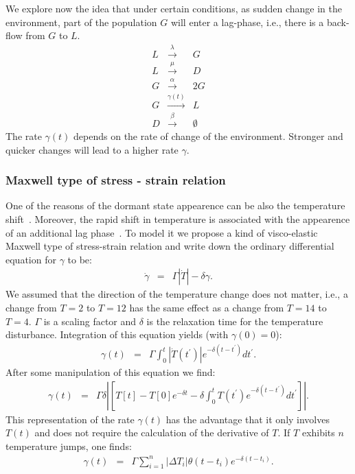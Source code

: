 \documentclass[10pt,A4paper]{article}
\begin{document}


We explore now the idea that under certain conditions, as sudden change in the environment, part of the population $G$ will enter a lag-phase, i.e., there is a back-flow from $G$ to $L$. 
\begin{eqnarray}
    L &\stackrel{\lambda}{\longrightarrow} & G\\
    L &\stackrel{\mu}{\longrightarrow} & D\\
    G &\stackrel{\alpha}{\longrightarrow} & 2G\\
    G &\stackrel{\gamma(t)}{\longrightarrow} & L\\
    D &\stackrel{\beta}{\longrightarrow} & \emptyset
\end{eqnarray}
The rate $\gamma(t)$ depends on the rate of change of the environment.
Stronger and quicker changes will lead to a higher rate $\gamma$. 
\subsubsection{Maxwell type of stress - strain relation}

One of the reasons of the dormant state appearence can be also the temperature shift~\cite{oliver_viable_1995}.
Moreover, the rapid shift in temperature is associated with the appearence of an additional lag phase~\cite{zwietering_modeling_1994}.
To model it we propose a kind of visco-elastic Maxwell type of stress-strain relation and write down the ordinary differential equation for $\gamma$ to be:
\begin{eqnarray}
\dot{\gamma} &=& \Gamma \left |\dot{T}\right |-\delta \gamma.
\end{eqnarray}
We assumed that the direction of the temperature change does not matter, i.e., a change from $T=2$ to $T=12$ has the same effect as a change from $T=14$ to $T=4$. 
$\Gamma$ is a scaling factor and $\delta$ is the relaxation time for the temperature disturbance. 
Integration of this equation yields (with $\gamma(0)=0$):
\begin{eqnarray}
\gamma(t) &=& \Gamma \int_0^t \left |\dot{T}(t^{\prime})\right |e^{-\delta (t-t^{\prime})}dt^{\prime}.
\end{eqnarray}
After some manipulation of this equation we find:
\begin{eqnarray}
\gamma(t) &=& \Gamma\delta\left |\left[T[t]-T[0]e^{-\delta t}-\delta \int_0^t T(t^{\prime})e^{-\delta (t-t^{\prime})}dt^{\prime}\right]\right |.
\end{eqnarray}
This representation of the rate $\gamma(t)$ has the advantage that it only involves $T(t)$ and does not require the calculation of the derivative of $T$. 
If $T$ exhibits $n$ temperature jumps, one finds:
\begin{eqnarray}
\gamma(t) &=& \Gamma\sum_{i=1}^n \left |\Delta T_i \right |\theta(t-t_i)e^{-\delta(t-t_i)}.
\label{eq:gamma_tempshift}
\end{eqnarray}
\end{document}
